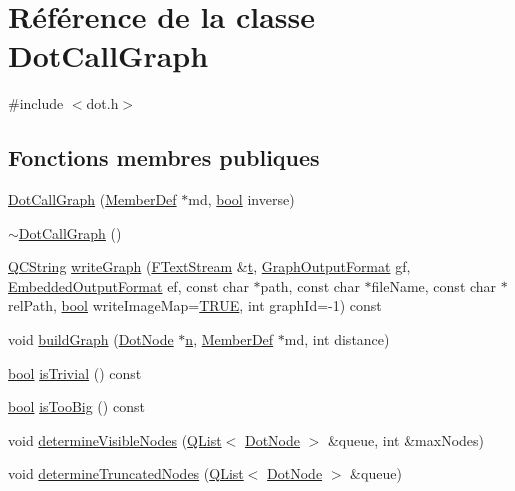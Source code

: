 \hypertarget{class_dot_call_graph}{}\section{Référence de la classe Dot\+Call\+Graph}
\label{class_dot_call_graph}


{\ttfamily \#include $<$dot.\+h$>$}

\subsection*{Fonctions membres publiques}
\begin{DoxyCompactItemize}
\item 
\hyperlink{class_dot_call_graph_acb6d03dcd52cf3a4d3e8ea623bdb2da0}{Dot\+Call\+Graph} (\hyperlink{class_member_def}{Member\+Def} $\ast$md, \hyperlink{qglobal_8h_a1062901a7428fdd9c7f180f5e01ea056}{bool} inverse)
\item 
\hyperlink{class_dot_call_graph_a865df0c042f08bec4f4e3a28076b0dd4}{$\sim$\+Dot\+Call\+Graph} ()
\item 
\hyperlink{class_q_c_string}{Q\+C\+String} \hyperlink{class_dot_call_graph_a69cfc401eaaff5a7aa9f1ed27a2c6822}{write\+Graph} (\hyperlink{class_f_text_stream}{F\+Text\+Stream} \&\hyperlink{058__bracket__recursion_8tcl_a69e959f6901827e4d8271aeaa5fba0fc}{t}, \hyperlink{dot_8h_ac60ef98d62b78366a17c9f1bda96523f}{Graph\+Output\+Format} gf, \hyperlink{dot_8h_a8680135da08a5ef57cebe20060912dcc}{Embedded\+Output\+Format} ef, const char $\ast$path, const char $\ast$file\+Name, const char $\ast$rel\+Path, \hyperlink{qglobal_8h_a1062901a7428fdd9c7f180f5e01ea056}{bool} write\+Image\+Map=\hyperlink{qglobal_8h_a04a6422a52070f0dc478693da640242b}{T\+R\+U\+E}, int graph\+Id=-\/1) const 
\item 
void \hyperlink{class_dot_call_graph_a37d014d7543ae64f653abdae4988d617}{build\+Graph} (\hyperlink{class_dot_node}{Dot\+Node} $\ast$\hyperlink{060__command__switch_8tcl_acdde3cd86eb2421ce8dbb2e85227d368}{n}, \hyperlink{class_member_def}{Member\+Def} $\ast$md, int distance)
\item 
\hyperlink{qglobal_8h_a1062901a7428fdd9c7f180f5e01ea056}{bool} \hyperlink{class_dot_call_graph_a82315e751c4340bcc736e12413e0f20a}{is\+Trivial} () const 
\item 
\hyperlink{qglobal_8h_a1062901a7428fdd9c7f180f5e01ea056}{bool} \hyperlink{class_dot_call_graph_ad559f85737a504d76d6308d692e58dc3}{is\+Too\+Big} () const 
\item 
void \hyperlink{class_dot_call_graph_addf14efc1a3021713c31070fe7e75641}{determine\+Visible\+Nodes} (\hyperlink{class_q_list}{Q\+List}$<$ \hyperlink{class_dot_node}{Dot\+Node} $>$ \&queue, int \&max\+Nodes)
\item 
void \hyperlink{class_dot_call_graph_a1bcba0cd9ce18996902651b8d306033d}{determine\+Truncated\+Nodes} (\hyperlink{class_q_list}{Q\+List}$<$ \hyperlink{class_dot_node}{Dot\+Node} $>$ \&queue)
\end{DoxyCompactItemize}


